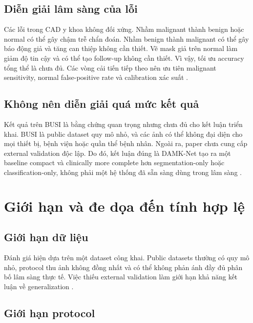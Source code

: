 \documentclass[12pt,a4paper,oneside]{report}
\newcommand{\modelname}{DAMK-Net}
\begin{document}
\section{Diễn giải lâm sàng của lỗi}

Các lỗi trong CAD y khoa không đối xứng. Nhầm malignant thành benign hoặc normal có thể gây chậm trễ chẩn đoán. Nhầm benign thành malignant có thể gây báo động giả và tăng can thiệp không cần thiết. Vẽ mask giả trên normal làm giảm độ tin cậy và có thể tạo follow-up không cần thiết. Vì vậy, tối ưu accuracy tổng thể là chưa đủ. Các vòng cải tiến tiếp theo nên ưu tiên malignant sensitivity, normal false-positive rate và calibration xác suất \citep{globocan,aumente,damknet}.

\section{Không nên diễn giải quá mức kết quả}

Kết quả trên BUSI là bằng chứng quan trọng nhưng chưa đủ cho kết luận triển khai. BUSI là public dataset quy mô nhỏ, và các ảnh có thể không đại diện cho mọi thiết bị, bệnh viện hoặc quần thể bệnh nhân. Ngoài ra, paper chưa cung cấp external validation độc lập. Do đó, kết luận đúng là \modelname{} tạo ra một baseline compact và clinically more complete hơn segmentation-only hoặc classification-only, không phải một hệ thống đã sẵn sàng dùng trong lâm sàng \citep{busi,damknet}.

\chapter{Giới hạn và đe dọa đến tính hợp lệ}

\section{Giới hạn dữ liệu}

Đánh giá hiện dựa trên một dataset công khai. Public datasets thường có quy mô nhỏ, protocol thu ảnh không đồng nhất và có thể không phản ánh đầy đủ phân bố lâm sàng thực tế. Việc thiếu external validation làm giới hạn khả năng kết luận về generalization \citep{busi,damknet}.

\section{Giới hạn protocol}
\end{document}

